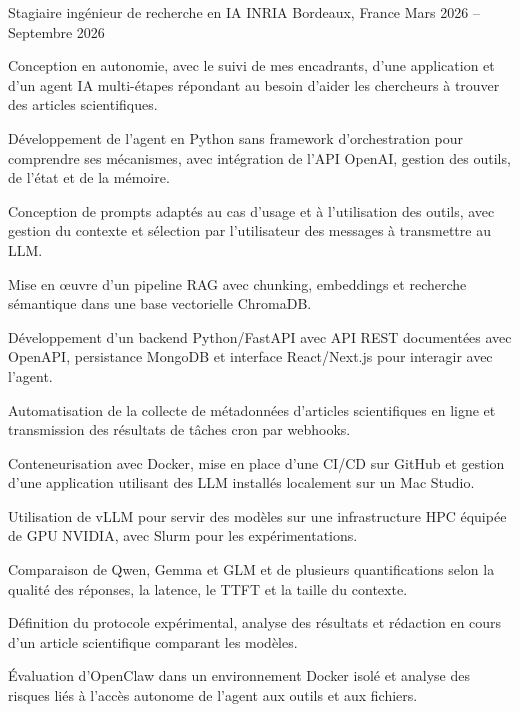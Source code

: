 
\begin{cventries}
  \cventry
    {Stagiaire ingénieur de recherche en IA}
    {INRIA}
    {Bordeaux, France}
    {Mars 2026 -- Septembre 2026}
    {
      \begin{cvitems}
        \item {Conception en autonomie, avec le suivi de mes encadrants, d’une application et d’un agent IA multi-étapes répondant au besoin d’aider les chercheurs à trouver des articles scientifiques.}
        \item {Développement de l’agent en Python sans framework d’orchestration pour comprendre ses mécanismes, avec intégration de l’API OpenAI, gestion des outils, de l’état et de la mémoire.}
        \item {Conception de prompts adaptés au cas d’usage et à l’utilisation des outils, avec gestion du contexte et sélection par l’utilisateur des messages à transmettre au LLM.}
        \item {Mise en œuvre d’un pipeline RAG avec chunking, embeddings et recherche sémantique dans une base vectorielle ChromaDB.}
        \item {Développement d’un backend Python/FastAPI avec API REST documentées avec OpenAPI, persistance MongoDB et interface React/Next.js pour interagir avec l’agent.}
        \item {Automatisation de la collecte de métadonnées d’articles scientifiques en ligne et transmission des résultats de tâches cron par webhooks.}
        \item {Conteneurisation avec Docker, mise en place d’une CI/CD sur GitHub et gestion d’une application utilisant des LLM installés localement sur un Mac Studio.}
        \item {Utilisation de vLLM pour servir des modèles sur une infrastructure HPC équipée de GPU NVIDIA, avec Slurm pour les expérimentations.}
        \item {Comparaison de Qwen, Gemma et GLM et de plusieurs quantifications selon la qualité des réponses, la latence, le TTFT et la taille du contexte.}
        \item {Définition du protocole expérimental, analyse des résultats et rédaction en cours d’un article scientifique comparant les modèles.}
        \item {Évaluation d’OpenClaw dans un environnement Docker isolé et analyse des risques liés à l’accès autonome de l’agent aux outils et aux fichiers.}
      \end{cvitems}
    }


\end{cventries}
